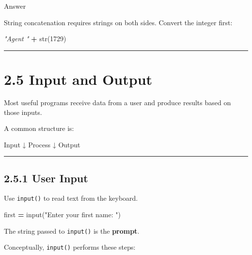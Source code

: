 \documentclass[
]{article}
\newenvironment{Shaded}{\begin{snugshade}}{\end{snugshade}}
\newcommand{\BuiltInTok}[1]{#1}
\newcommand{\CommentTok}[1]{\textcolor[rgb]{0.56,0.35,0.01}{\textit{#1}}}
\newcommand{\DecValTok}[1]{\textcolor[rgb]{0.00,0.00,0.81}{#1}}
\newcommand{\NormalTok}[1]{#1}
\newcommand{\OperatorTok}[1]{\textcolor[rgb]{0.81,0.36,0.00}{\textbf{#1}}}
\newcommand{\StringTok}[1]{\textcolor[rgb]{0.31,0.60,0.02}{#1}}
\begin{document}
Answer

String concatenation requires strings on both sides. Convert the integer
first:

\begin{Shaded}
\begin{Highlighting}[]
\CommentTok{"Agent "} \OperatorTok{+} \BuiltInTok{str}\NormalTok{(}\DecValTok{1729}\NormalTok{)}
\end{Highlighting}
\end{Shaded}

\begin{center}\rule{0.5\linewidth}{0.5pt}\end{center}

\section{2.5 Input and Output}\label{input-and-output}

Most useful programs receive data from a user and produce results based
on those inputs.

A common structure is:

\begin{Shaded}
\begin{Highlighting}[]
\NormalTok{Input}
\NormalTok{  ↓}
\NormalTok{Process}
\NormalTok{  ↓}
\NormalTok{Output}
\end{Highlighting}
\end{Shaded}

\begin{center}\rule{0.5\linewidth}{0.5pt}\end{center}

\subsection{2.5.1 User Input}\label{user-input}

Use \texttt{input()} to read text from the keyboard.

\begin{Shaded}
\begin{Highlighting}[]
\NormalTok{first }\OperatorTok{=} \BuiltInTok{input}\NormalTok{(}\StringTok{"Enter your first name: "}\NormalTok{)}
\end{Highlighting}
\end{Shaded}

The string passed to \texttt{input()} is the \textbf{prompt}.

Conceptually, \texttt{input()} performs these steps:
\end{document}
